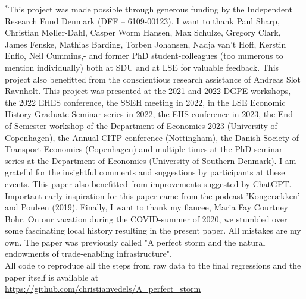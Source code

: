 \documentclass[11pt]{article}
\begin{document}
\begin{titlepage}
    
    
    \vfill
    
    \footnotesize
    $^*$This project was made possible through generous funding by the Independent Research Fund Denmark (DFF – 6109-00123). I want to thank Paul Sharp, Christian Møller-Dahl, Casper Worm Hansen, Max Schulze, Gregory Clark, James Fenske, Mathias Barding, Torben Johansen, Nadja van't Hoff, Kerstin Enflo, Neil Cummins,- and former PhD student-colleagues (too numerous to mention individually) both at SDU and at LSE for valuable feedback. This project also benefitted from the conscientious research assistance of Andreas Slot Ravnholt. This project was presented at the 2021 and 2022 DGPE workshops, the 2022 EHES conference, the SSEH meeting in 2022, in the LSE Economic History Graduate Seminar series in 2022, the EHS conference in 2023, the End-of-Semester workshop of the Department of Economics 2023 (University of Copenhagen), the Annual CITP conference (Nottingham), the Danish Society of Transport Economics (Copenhagen) and multiple times at the PhD seminar series at the Department of Economics (University of Southern Denmark). I am grateful for the insightful comments and suggestions by participants at these events. This paper also benefitted from improvements suggested by ChatGPT. Important early inspiration for this paper came from the podcast 'Kongerækken' and Poulsen (2019). Finally, I want to thank my fiancee, Maria Fay Courtney Bohr. On our vacation during the COVID-summer of 2020, we stumbled over some fascinating local history resulting in the present paper.  All mistakes are my own. The paper was previously called "A perfect storm and the natural endowments of trade-enabling infrastructure". \\
    All code to reproduce all the steps from raw data to the final regressions and the paper itself is available at \\ \url{https://github.com/christianvedels/A_perfect_storm}
    

\end{titlepage}
\newpage
\end{document}
